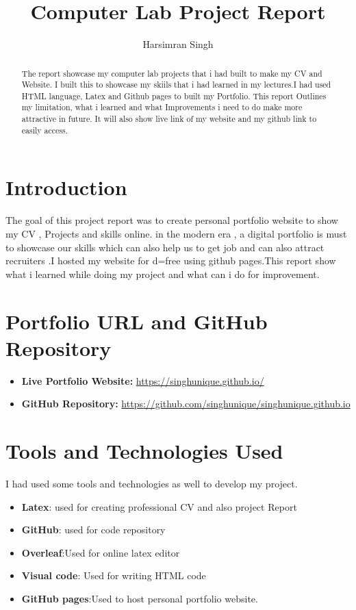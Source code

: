 \documentclass{article}
\title{Computer Lab Project Report}
\author{Harsimran Singh}
\begin{document}
\maketitle

\begin{abstract}
The report showcase my computer lab projects that i had built to make my CV and Website. I built this to showcase my skiils that i had learned in my lectures.I had used HTML language, Latex and Github pages to built my Portfolio. This report Outlines my limitation, what i learned and what Improvements i need to do make more attractive in future. It will also show live link of my website and my github link to easily access.
\end{abstract}

\section{Introduction}

The goal of this project report was to create personal portfolio website to show my CV , Projects and skills online. in the modern era , a digital portfolio is must to showcase our skills which can also help us to get job and can also attract recruiters .I hosted my website for d=free using github pages.This report show what i learned while doing my project and what can i do for improvement. 



\section{Portfolio URL and GitHub Repository}

\begin{itemize}
    \item \textbf{Live Portfolio Website:} \url{https://singhunique.github.io/}
    \item \textbf{GitHub Repository:} \url{https://github.com/singhunique/singhunique.github.io}
\end{itemize}

\section{Tools and Technologies Used}
I had used some tools and technologies as well to develop my project.
\begin{itemize}
    \item \textbf{Latex}: used for creating professional CV and also project Report 
    \item \textbf{GitHub}: used for code repository 
    \item \textbf{Overleaf}:Used for online latex editor
    \item \textbf{Visual code}: Used for writing HTML code
    \item \textbf{GitHub pages}:Used to host personal portfolio website.
\end{itemize}
\end{document}
